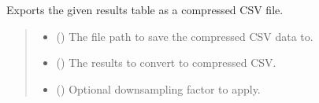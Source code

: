 \documentclass[letterpaper,10pt,english]{sphinxmanual}
\begin{document}
\begin{fulllineitems}
\label{\detokenize{modules/output/formats:qnav.output.formats.save_as_csv_comp}}
\pysigstartsignatures
{}
\pysigstopsignatures
\sphinxAtStartPar
Exports the given results table as a compressed CSV file.
\begin{quote}\begin{description}
\begin{itemize}
\item {} 
\sphinxAtStartPar
{} () \textendash{} The file path to save the compressed CSV data to.

\item {} 
\sphinxAtStartPar
{} ({\hyperref[\detokenize{modules/output/data:qnav.output.data.ResultsTable}]{}}) \textendash{} The results to convert to compressed CSV.

\item {} 
\sphinxAtStartPar
{} () \textendash{} Optional down\sphinxhyphen{}sampling factor to apply.

\end{itemize}

\end{description}\end{quote}

\end{fulllineitems}

\end{document}
